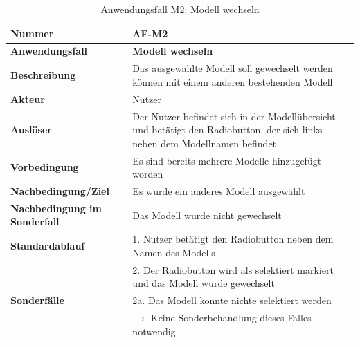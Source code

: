 \documentclass[oneside]{ausarbeitung}
\begin{document}
\begin{table}[htbp]
	\centering
	\begin{tabular}{|l|p{80mm}|}
		\hline
		\textbf{Nummer} & \textbf{AF-M2} \\ \hline
		\textbf{Anwendungsfall} & \textbf{Modell wechseln} \\ \hline
		\textbf{Beschreibung} & Das ausgewählte Modell soll gewechselt werden können mit einem anderen bestehenden Modell \\ \hline
		\textbf{Akteur} & Nutzer \\ \hline
		\textbf{Auslöser} & Der Nutzer befindet sich in der Modellübersicht und betätigt den Radiobutton, der sich links neben dem Modellnamen befindet  \\ \hline
		\textbf{Vorbedingung} & Es sind bereits mehrere Modelle hinzugefügt worden \\ \hline	
		\textbf{Nachbedingung/Ziel} & Es wurde ein anderes Modell ausgewählt \\ \hline
		\textbf{Nachbedingung im Sonderfall} & Das Modell wurde nicht gewechselt \\ \hline
		\textbf{Standardablauf} & 1. Nutzer betätigt den Radiobutton neben dem Namen des Modells \\
		& 2. Der Radiobutton wird als selektiert markiert und das Modell wurde gewechselt \\ \hline
		\textbf{Sonderfälle} & 2a. Das Modell konnte nichte selektiert werden \\ & $\rightarrow$ Keine Sonderbehandlung dieses Falles notwendig \\ \hline
		
	\end{tabular}
	\caption{Anwendungsfall M2: Modell wechseln}
	\label{tab:use-case-change-model}
\end{table}
\end{document}
